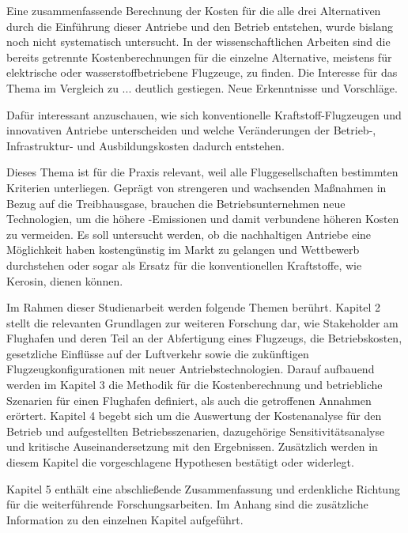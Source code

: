 Eine zusammenfassende Berechnung der Kosten für die alle drei Alternativen durch die Einführung dieser Antriebe und den Betrieb entstehen, 
wurde bislang noch nicht systematisch
untersucht. In der wissenschaftlichen Arbeiten sind die bereits getrennte Kostenberechnungen für die einzelne Alternative, meistens für 
elektrische oder wasserstoffbetriebene Flugzeuge, zu finden. Die Interesse für das Thema im Vergleich zu ... deutlich gestiegen.
Neue Erkenntnisse und Vorschläge.

Dafür interessant anzuschauen, wie sich konventionelle Kraftstoff-Flugzeugen und innovativen Antriebe unterscheiden 
und welche Veränderungen der Betrieb-, Infrastruktur- und Ausbildungskosten dadurch entstehen.

Dieses Thema ist für die Praxis relevant, weil alle Fluggesellschaften bestimmten Kriterien unterliegen. 
Geprägt von strengeren und wachsenden Maßnahmen in Bezug auf die Treibhausgase, brauchen die Betriebsunternehmen neue Technologien, um die  
höhere -Emissionen und damit verbundene höheren Kosten zu vermeiden.
Es soll untersucht werden, ob die nachhaltigen Antriebe eine Möglichkeit haben kostengünstig im Markt zu gelangen und Wettbewerb durchstehen oder 
sogar als Ersatz für die konventionellen Kraftstoffe, wie Kerosin, dienen können.

Im Rahmen dieser Studienarbeit werden folgende Themen berührt.
Kapitel 2 stellt die relevanten Grundlagen zur weiteren Forschung dar, wie Stakeholder am Flughafen und deren Teil an der Abfertigung eines Flugzeugs,
die Betriebskosten, gesetzliche Einflüsse auf der Luftverkehr sowie die zukünftigen Flugzeugkonfigurationen mit neuer Antriebstechnologien.
Darauf aufbauend werden im Kapitel 3 die Methodik für die Kostenberechnung und betriebliche Szenarien für einen Flughafen definiert, 
als auch die getroffenen Annahmen erörtert.
Kapitel 4 begebt sich um die Auswertung der Kostenanalyse für den Betrieb und aufgestellten Betriebsszenarien, dazugehörige Sensitivitätsanalyse und
kritische Auseinandersetzung mit den Ergebnissen. Zusätzlich werden in diesem Kapitel die vorgeschlagene Hypothesen bestätigt oder widerlegt.

Kapitel 5 enthält eine abschließende Zusammenfassung und erdenkliche Richtung für die weiterführende Forschungsarbeiten.
Im Anhang sind die zusätzliche Information zu den einzelnen Kapitel aufgeführt.

